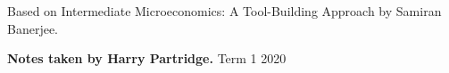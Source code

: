 \begin{titlepage}
    \begin{center}
    \vspace*{15em}
    \vspace{2em}

    \begin{Large}
    Based on Intermediate Microeconomics: A Tool-Building Approach by Samiran Banerjee.
    \end{Large}

    \vspace{1em}
    \textbf{Notes taken by Harry Partridge.}
    \vfill
    Term 1 2020
    \end{center}
 \end{titlepage}